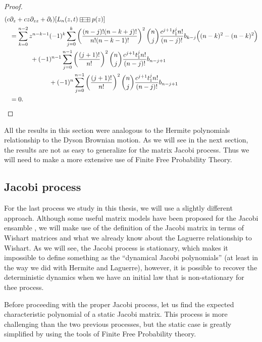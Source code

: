 \begin{proof}
    \begin{align*}
        (c&\partial_z + cz\partial_{zz} + \partial_t )[L_n(z,t)\aac p(z)] \\  &= \sum_{k=0}^{n-2} z^{n-k-1}(-1)^k \sum_{j=0}^{k} \left(\frac{(n-j)!(n-k+j)!}{n!(n-k-1)!}\right)^2 \binom{n}{j}\frac{c^{j+1}t_1^{j}n!}{(n-j)!}b_{k-j}\Bigl((n-k)^2 - (n-k)^2\Bigr)\\ 
        &\phantom{espacio}+ (-1)^{n-1}\sum_{j=0}^{n-1} \left( \frac{(j+1)!}{n!} \right)^2\binom{n}{j}\frac{c^{j+1}t_1^{j}n!}{(n-j)!}b_{n-j+1}\\
        &\phantom{espaciooooooo} + (-1)^{n}\sum_{j=0}^{n-1} \left( \frac{(j+1)!}{n!} \right)^2\binom{n}{j}\frac{c^{j+1}t_1^{j}n!}{(n-j)!}b_{n-j+1} \\
        &= 0.
    \end{align*}
\end{proof}

All the results in this section were analogous to the Hermite polynomials relationship to the Dyson Brownian motion. As we will see in the next section, the results are not as easy to generalize for the matrix Jacobi process. Thus we will need to make a more extensive use of Finite Free Probability Theory.

\subsection{Jacobi process}

For the last process we study in this thesis, we will use a slightly different approach. Although some useful matrix models have been proposed for the Jacobi ensamble \cite{article:jacobi_matrix_model,article:edelman_sutton_jacobi}, we will make use of the definition of the Jacobi matrix in terms of Wishart matrices and what we already know about the Laguerre relationship to Wishart. As we will see, the Jacobi process is stationary, which makes it impossible to define something as the ``dynamical Jacobi polynomials'' (at least in the way we did with Hermite and Laguerre), however, it is possible to recover the deterministic dynamics when we have an initial law that is non-stationary for thee process. 

Before proceeding with the proper Jacobi process, let us find the expected characteristic polynomial of a static Jacobi matrix. This process is more challenging than the two previous processes, but the static case is greatly simplified by using the tools of Finite Free Probability theory. 

